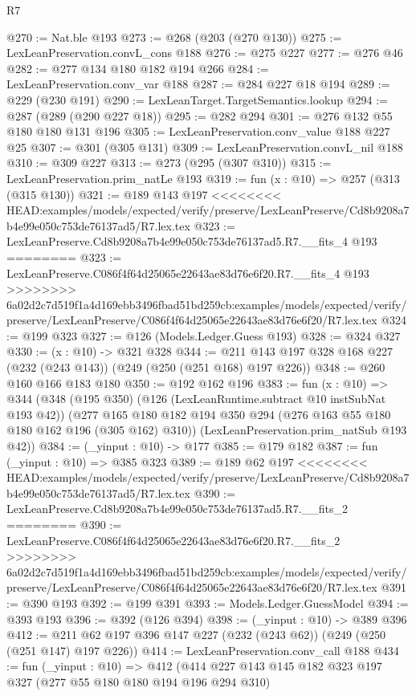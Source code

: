 \begin{lexlean}{R7}
\begin{coremodule}
{{{{{{{{{{{{{@270 := Nat.ble @193
@273 := @268 (@203 (@270 @130))
@275 := LexLeanPreservation.convL_cons @188
@276 := @275 @227
@277 := @276 @46
@282 := @277 @134 @180 @182 @194 @266
@284 := LexLeanPreservation.conv_var @188
@287 := @284 @227 @18 @194
@289 := @229 (@230 @191)
@290 := LexLeanTarget.TargetSemantics.lookup
@294 := @287 (@289 (@290 @227 @18))
@295 := @282 @294
@301 := @276 @132 @55 @180 @180 @131 @196
@305 := LexLeanPreservation.conv_value @188 @227 @25
@307 := @301 (@305 @131)
@309 := LexLeanPreservation.convL_nil @188
@310 := @309 @227
@313 := @273 (@295 (@307 @310))
@315 := LexLeanPreservation.prim_natLe @193
@319 := fun (x : @10) => @257 (@313 (@315 @130))
@321 := @189 @143 @197
<<<<<<<< HEAD:examples/models/expected/verify/preserve/LexLeanPreserve/Cd8b9208a7b4e99e050c753de76137ad5/R7.lex.tex
@323 := LexLeanPreserve.Cd8b9208a7b4e99e050c753de76137ad5.R7.__fits_4 @193
========
@323 := LexLeanPreserve.C086f4f64d25065e22643ae83d76e6f20.R7.__fits_4 @193
>>>>>>>> 6a02d2c7d519f1a4d169ebb3496fbad51bd259cb:examples/models/expected/verify/preserve/LexLeanPreserve/C086f4f64d25065e22643ae83d76e6f20/R7.lex.tex
@324 := @199 @323
@327 := @126 (Models.Ledger.Guess @193)
@328 := @324 @327
@330 := (x : @10) -> @321 @328
@344 := @211 @143 @197 @328 @168 @227 (@232 (@243 @143)) (@249 (@250 (@251 @168) @197 @226))
@348 := @260 @160 @166 @183 @180
@350 := @192 @162 @196
@383 := fun (x : @10) =>
  @344
    (@348
      (@195 @350)
      (@126 (LexLeanRuntime.subtract @10 instSubNat @193 @42))
      (@277 @165 @180 @182 @194 @350 @294 (@276 @163 @55 @180 @180 @162 @196 (@305 @162) @310))
      (LexLeanPreservation.prim_natSub @193 @42))
@384 := (_yinput : @10) -> @177
@385 := @179 @182
@387 := fun (_yinput : @10) => @385 @323
@389 := @189 @62 @197
<<<<<<<< HEAD:examples/models/expected/verify/preserve/LexLeanPreserve/Cd8b9208a7b4e99e050c753de76137ad5/R7.lex.tex
@390 := LexLeanPreserve.Cd8b9208a7b4e99e050c753de76137ad5.R7.__fits_2
========
@390 := LexLeanPreserve.C086f4f64d25065e22643ae83d76e6f20.R7.__fits_2
>>>>>>>> 6a02d2c7d519f1a4d169ebb3496fbad51bd259cb:examples/models/expected/verify/preserve/LexLeanPreserve/C086f4f64d25065e22643ae83d76e6f20/R7.lex.tex
@391 := @390 @193
@392 := @199 @391
@393 := Models.Ledger.GuessModel
@394 := @393 @193
@396 := @392 (@126 @394)
@398 := (_yinput : @10) -> @389 @396
@412 := @211 @62 @197 @396 @147 @227 (@232 (@243 @62)) (@249 (@250 (@251 @147) @197 @226))
@414 := LexLeanPreservation.conv_call @188
@434 := fun (_yinput : @10) =>
  @412
    (@414
      @227
      @143
      @145
      @182
      @323
      @197
      @327
      (@277 @55 @180 @180 @194 @196 @294 @310)
}}}}}}}}}}}}}
\end{coremodule}
\end{lexlean}
